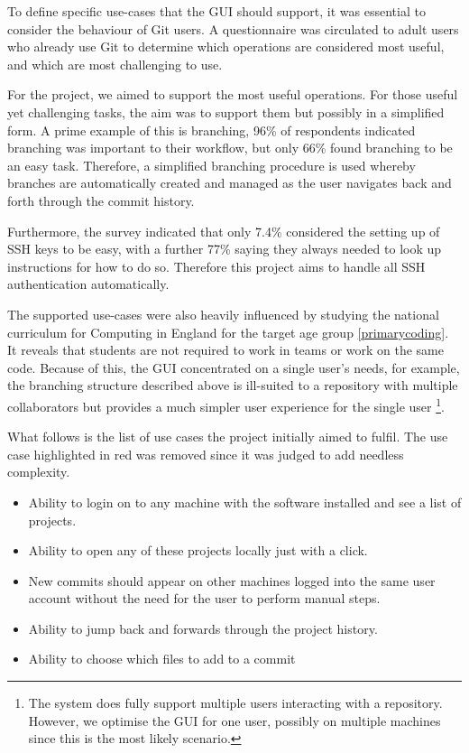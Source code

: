 To define specific use-cases that the GUI should support, it was essential to consider the behaviour of Git users. A questionnaire was circulated to adult users who already use Git to determine which operations are considered most useful, and which are most challenging to use. 

For the project, we aimed to support the most useful operations. For those useful yet challenging tasks, the aim was to support them but possibly in a simplified form. A prime example of this is branching, 96\% of respondents indicated branching was important to their workflow, but only 66\% found branching to be an easy task. Therefore, a simplified branching procedure is used whereby branches are automatically created and managed as the user navigates back and forth through the commit history.

Furthermore, the survey indicated that only 7.4\%  considered the setting up of SSH keys to be easy, with a further 77\% saying they always needed to look up instructions for how to do so. Therefore this project aims to handle all SSH authentication automatically.

The supported use-cases were also heavily influenced by studying the national curriculum for Computing in England for the target age group \ref{primarycoding}. It reveals that students are not required to work in teams or work on the same code. Because of this, the GUI concentrated on a single user's needs, for example, the branching structure described above is ill-suited to a repository with multiple collaborators but provides a much simpler user experience for the single user \footnote{The system does fully support multiple users interacting with a repository. However, we optimise the GUI for one user, possibly on multiple machines since this is the most likely scenario. }.

What follows is the list of use cases the project initially aimed to fulfil. The use case highlighted in red was removed since it was judged to add needless complexity.

\begin{itemize}
\item Ability to login on to any machine with the software installed and see a list of projects.
\item Ability to open any of these projects locally just with a click.
\item New commits should appear on other machines logged into the same user account without the need for the user to perform manual steps.
\item Ability to jump back and forwards through the project history.
\item \color{red}Ability to choose which files to add to a commit \color{black}
\end{itemize}

